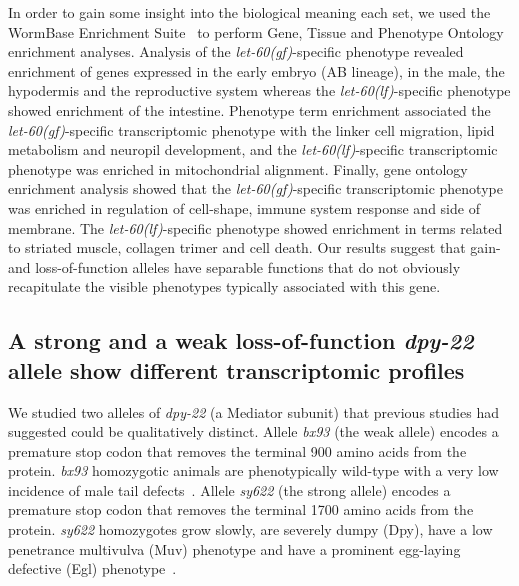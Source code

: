 \documentclass[10pt, onecolumn]{article}
\newcommand{\gene}[1]{\mbox{\emph{#1}}}
\newcommand{\letgf}{\gene{let-60(gf)}}
\newcommand{\letlf}{\gene{let-60(lf)}}
\begin{document}
In order to gain some insight into the biological meaning each set, we used the
WormBase Enrichment Suite~\cite{} to perform Gene, Tissue and Phenotype Ontology
enrichment analyses. Analysis of the \letgf{}-specific phenotype revealed
enrichment of genes expressed in the early embryo (AB lineage), in the male, the
hypodermis and the reproductive system whereas the \letlf{}-specific phenotype
showed enrichment of the intestine. Phenotype term enrichment associated the
\letgf{}-specific transcriptomic phenotype with the linker cell migration, lipid
metabolism and neuropil development, and the \letlf{}-specific transcriptomic
phenotype was enriched in mitochondrial alignment. Finally, gene ontology
enrichment analysis showed that the \letgf{}-specific transcriptomic phenotype
was enriched in regulation of cell-shape, immune system response and side of
membrane. The \letlf{}-specific phenotype showed enrichment in terms related to
striated muscle, collagen trimer and cell death. Our results suggest that gain-
and loss-of-function alleles have separable functions that do not obviously
recapitulate the visible phenotypes typically associated with this gene.

\subsection*{A strong and a weak loss-of-function \gene{dpy-22} allele show
             different transcriptomic profiles}
We studied two alleles of \gene{dpy-22} (a Mediator subunit) that previous
studies had suggested could be qualitatively distinct. Allele \emph{bx93} (the
weak allele) encodes a premature stop codon that removes the terminal 900 amino
acids from the protein. \emph{bx93} homozygotic animals are phenotypically
wild-type with a very low incidence of male tail defects~\cite{}. Allele
\emph{sy622} (the strong allele) encodes a premature stop codon that removes the
terminal 1700 amino acids from the protein. \emph{sy622} homozygotes grow
slowly, are severely dumpy (Dpy), have a low penetrance multivulva (Muv) phenotype
and have a prominent egg-laying defective (Egl) phenotype~\cite{Moghal2003}.
\end{document}
